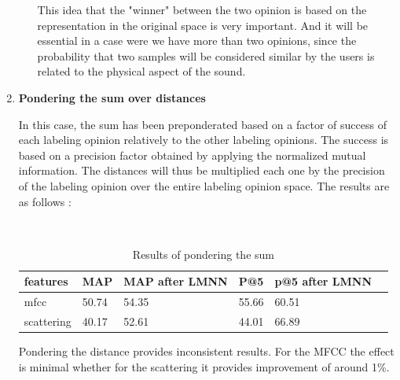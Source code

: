 \documentclass[hidelinks,12pt]{report}
\begin{document}
\begin{enumerate}
\begin{enumerate}
This idea that the "winner" between the two opinion is based on the representation in the original space is very important. And it will be essential in a case were we have more than two opinions, since the probability that two samples will be considered similar by the users is related to the physical aspect of the sound. 
 \end{enumerate}
 \item \textbf{Pondering the sum over distances} \par 
In this case, the sum has been preponderated based on a factor of success of each labeling opinion relatively to the other labeling opinions. The success is based on a precision factor obtained by applying the normalized mutual information. The distances will thus be multiplied each one by the precision of the labeling opinion over the entire labeling opinion space. The results are as follows :
\begin{table} [H]
\begin{center} 
\ 
 \setlength{\tabcolsep}{.16667em} 
\begin{tabular}{ | l | l | l | l | l | l |}
\hline
features & MAP & MAP after LMNN & P@5 & p@5 after LMNN  \\ 
\hline 
mfcc & 50.74& 54.35 & 55.66 & 60.51  \\ 
scattering & 40.17 & 52.61 & 44.01 & 66.89  \\ 
\hline
\end{tabular} 
\end{center} 
\caption{Results of pondering the sum} 
\label{you} 
\end{table} 
 
 Pondering the distance provides inconsistent results. For the MFCC the effect is minimal whether for the scattering it provides improvement of around 1\%.
 

\end{enumerate}
\end{document}
